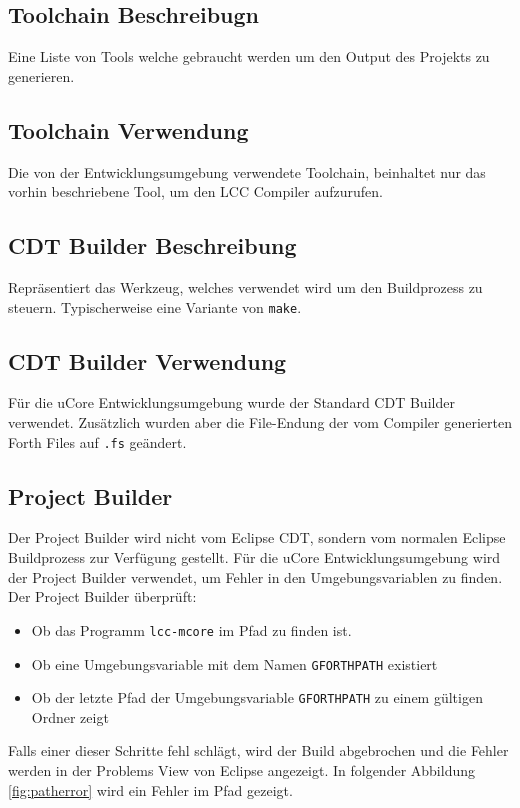 \subsection{Toolchain Beschreibugn}
Eine Liste von Tools welche gebraucht werden um den Output des Projekts zu generieren. 

\subsection{Toolchain Verwendung}
Die von der Entwicklungsumgebung verwendete Toolchain, beinhaltet nur das vorhin beschriebene Tool, um den LCC Compiler aufzurufen.

\subsection{CDT Builder Beschreibung}
Repräsentiert das Werkzeug, welches verwendet wird um den Buildprozess zu steuern. Typischerweise eine Variante von \verb!make!. 

\subsection{CDT Builder Verwendung}
Für die uCore Entwicklungsumgebung wurde der Standard CDT Builder verwendet. Zusätzlich wurden aber die File-Endung der vom Compiler generierten Forth Files auf \verb!.fs! geändert.

\subsection{Project Builder}
Der Project Builder wird nicht vom Eclipse CDT, sondern vom normalen Eclipse Buildprozess zur Verfügung gestellt. Für die uCore Entwicklungsumgebung wird der Project Builder verwendet, um Fehler in den Umgebungsvariablen zu finden. Der Project Builder überprüft:
%
\begin{itemize}
  \item Ob das Programm \verb!lcc-mcore! im Pfad zu finden ist.
  \item Ob eine Umgebungsvariable mit dem Namen \verb!GFORTHPATH! existiert
  \item Ob der letzte Pfad der Umgebungsvariable \verb!GFORTHPATH! zu einem gültigen Ordner zeigt
\end{itemize}
%
Falls einer dieser Schritte fehl schlägt, wird der Build abgebrochen und die Fehler werden in der Problems View von Eclipse angezeigt. In folgender Abbildung \ref{fig:patherror} wird ein Fehler im Pfad gezeigt.

